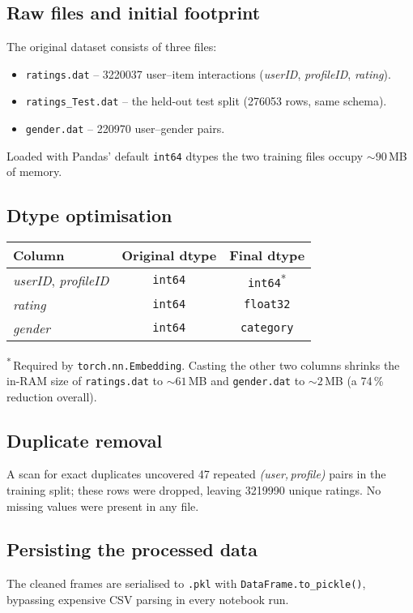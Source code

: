 \subsection*{Raw files and initial footprint}

The original dataset consists of three files:

\begin{itemize}
  \item \texttt{ratings.dat} – \num{3220037} user--item interactions
        (\textit{userID}, \textit{profileID}, \textit{rating})\@.
  \item \texttt{ratings\_Test.dat} – the held-out test split
        (\num{276053} rows, same schema).
  \item \texttt{gender.dat} – \num{220970} user--gender pairs.
\end{itemize}

Loaded with Pandas’ default \texttt{int64} dtypes the two training files occupy
$\sim\!90$\,MB of memory.

\subsection*{Dtype optimisation}

\vspace{2pt}
\begin{tabular}{@{}lcc@{}}
\toprule
\textbf{Column} & \textbf{Original dtype} & \textbf{Final dtype} \\ \midrule
\textit{userID}, \textit{profileID} & \texttt{int64} & \texttt{int64}\textsuperscript{*} \\
\textit{rating}                     & \texttt{int64} & \texttt{float32} \\
\textit{gender}                     & \texttt{int64} & \texttt{category} \\ \bottomrule
\end{tabular}

\smallskip
\noindent\textsuperscript{*}\,Required by \texttt{torch.nn.Embedding}.
Casting the other two columns shrinks the in-RAM size of
\texttt{ratings.dat} to $\sim\!61$\,MB and \texttt{gender.dat} to
$\sim\!2$\,MB (a 74\,\% reduction overall).

\subsection*{Duplicate removal}

A scan for exact duplicates uncovered \num{47} repeated
\textit{(user,\,profile)} pairs in the training split; these rows were
dropped, leaving \num{3219990} unique ratings.  
No missing values were present in any file.

\subsection*{Persisting the processed data}

The cleaned frames are serialised to \texttt{.pkl} with
\texttt{DataFrame.to\_pickle()}, bypassing expensive CSV parsing in every
notebook run.
